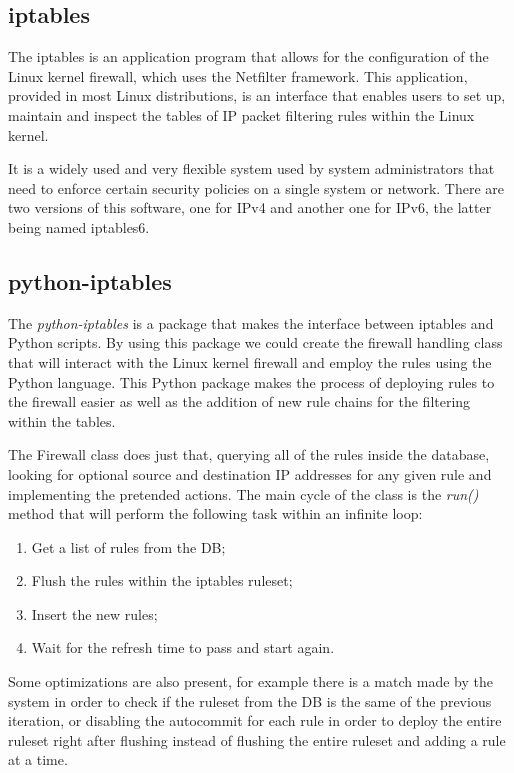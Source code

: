 \begin{enumerate}
\subsection{iptables}
\label{chap4:sec:firewall-sys:sub:iptables}
The iptables is an application program that allows for the configuration of the
Linux kernel firewall, which uses the Netfilter framework. This application,
provided in most Linux distributions, is an interface that enables users to
set up, maintain and inspect the tables of IP packet filtering rules within the
Linux kernel.

It is a widely used and very flexible system used by system administrators that
need to enforce certain security policies on a single system or network. There
are two versions of this software, one for IPv4 and another one for IPv6, the
latter being named iptables6.

\subsection{python-iptables}
\label{chap4:sec:firewall-sys:sub:iptc}
The \emph{python-iptables} is a package that makes the interface between
iptables and Python scripts. By using this package we could create the firewall
handling class that will interact with the Linux kernel firewall and employ the
rules using the Python language.
This Python package makes the process of deploying rules to the firewall easier
as well as the addition of new rule chains for the filtering within the tables.

The Firewall class does just that, querying all of the rules inside the
database, looking for optional source and destination IP addresses for any given
rule and implementing the pretended actions.
The main cycle of the class is the \emph{run()} method that will perform the
following task within an infinite loop:

\begin{enumerate}
	\item Get a list of rules from the DB;
	\item Flush the rules within the iptables ruleset;
	\item Insert the new rules;
	\item Wait for the refresh time to pass and start again.
\end{enumerate}

Some optimizations are also present, for example there is a match made by the
system in order to check if the ruleset from the DB is the same of the previous
iteration, or disabling the autocommit for each rule in order to deploy the
entire ruleset right after flushing instead of flushing the entire ruleset and
adding a rule at a time.


\end{enumerate}

